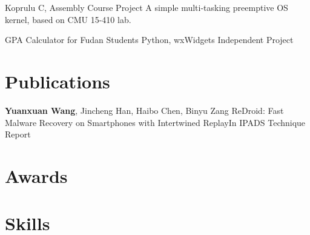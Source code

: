 \documentclass[11pt,a4paper]{moderncv}
\begin{document}
\vspace*{0.2\baselineskip}
{Koprulu}
{C, Assembly}
{Course Project}{}
{
A simple multi-tasking preemptive OS kernel, based on CMU 15-410 lab.
}

\vspace*{0.2\baselineskip}
{GPA Calculator for Fudan Students}
{Python, wxWidgets}
{Independent Project}{}
{}

\section{Publications}

{\textbf{Yuanxuan Wang}\textnormal{, Jincheng Han, Haibo Chen, Binyu Zang}}
{ReDroid: Fast Malware Recovery on Smartphones with Intertwined Replay}{In IPADS Technique Report}
{}{}{}

\section{Awards}

\section{Skills}
\end{document}
